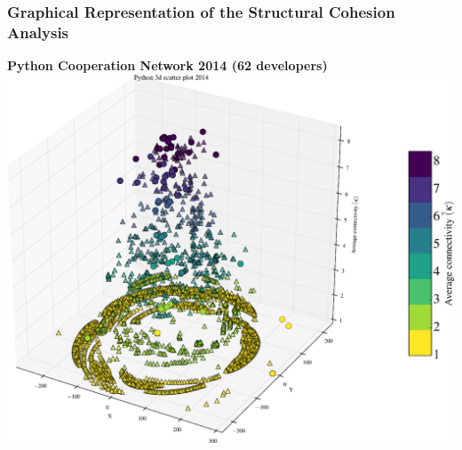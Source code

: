 \documentclass[ignorenonframetext,red,8pt,notes=hide]{beamer}
\begin{document}
\begin{frame}
\frametitle{Graphical Representation of the Structural Cohesion Analysis}

\begin{center}
\textbf{Python Cooperation Network 2014 (62 developers)}
\includegraphics[scale=0.25]{img/3d_scatter_python_2014}
\end{center}

\end{frame}
\end{document}
